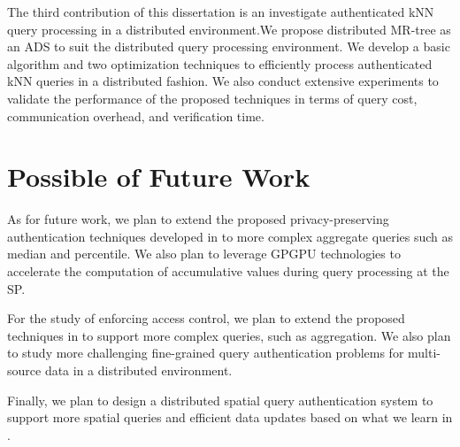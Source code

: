 The third contribution of this dissertation is an investigate authenticated kNN query processing in a distributed environment.We propose distributed MR-tree as an ADS to suit the distributed query processing environment. We develop a basic algorithm and two optimization techniques to efficiently process authenticated kNN queries in a distributed fashion. We also conduct extensive experiments to validate the performance of the proposed techniques in terms of query cost, communication overhead, and verification time.

\section{Possible of Future Work}

As for future work, we plan to extend the proposed privacy-preserving authentication techniques developed in  to more complex aggregate queries such as median and percentile. We also plan to leverage GPGPU technologies to accelerate the computation of accumulative values during query processing at the SP\@.

For the study of enforcing access control, we plan to extend the proposed techniques in  to support more complex queries, such as aggregation. We also plan to study more challenging fine-grained query authentication problems for multi-source data in a distributed environment.

Finally, we plan to design a distributed spatial query authentication system to support more spatial queries and efficient data updates based on what we learn in .
